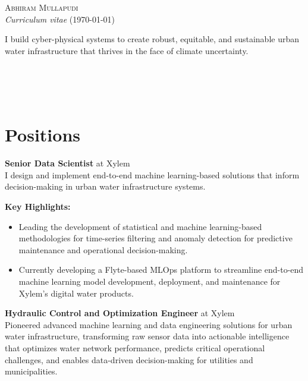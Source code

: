\documentclass[a4paper,11pt]{article}
\newcommand{\years}[1]{%
  {\reversemarginpar\strut\marginnote{{\small#1}}}%
}
\begin{document}
{\huge \textsc{Abhiram Mullapudi}}\\
{\small \textit{Curriculum vitae} (\today)}\\

\begin{vwcol}[widths={0.78,0.22}]
{\footnotesize I build cyber-physical systems to create robust, equitable, and sustainable urban water infrastructure that thrives in the face of climate uncertainty.}

\vfill\eject

{\scriptsize {\noindent
{\faEnvelope{}}\\
{\faHome{}}\\
{\faGithub{}}\\}}
\end{vwcol}

\section*{Positions}

\years{2023--}
\textbf{Senior Data Scientist} at Xylem\\[0.1cm]
I design and implement end-to-end machine learning-based solutions that inform decision-making in urban water infrastructure systems.

\vspace{2mm}
{\small \textbf{Key Highlights:}}
\vspace{-2mm}
\begin{itemize}
	\setlength\itemsep{1mm}
	\item  Leading the development of statistical and machine learning-based methodologies for time-series filtering and anomaly detection for predictive maintenance and operational decision-making.
	\item  Currently developing a Flyte-based MLOps platform to streamline end-to-end machine learning model development, deployment, and maintenance for Xylem's digital water products.
\end{itemize}

\years{2020--2023}
\textbf{Hydraulic Control and Optimization Engineer} at Xylem\\[0.1cm]
Pioneered advanced machine learning and data engineering solutions for urban water infrastructure, transforming raw sensor data into actionable intelligence that optimizes water network performance, predicts critical operational challenges, and enables data-driven decision-making for utilities and municipalities.
\end{document}
